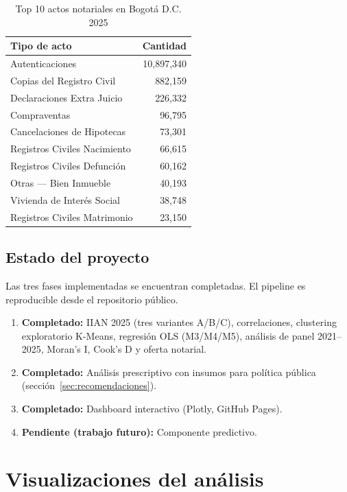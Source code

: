 \documentclass{article}
\begin{document}
\begin{table}[H]
\centering
\begin{tabular}{lr}
\toprule
\textbf{Tipo de acto} & \textbf{Cantidad} \\
\midrule
Autenticaciones              & 10,897,340 \\
Copias del Registro Civil    &    882,159 \\
Declaraciones Extra Juicio   &    226,332 \\
Compraventas                 &     96,795 \\
Cancelaciones de Hipotecas   &     73,301 \\
Registros Civiles Nacimiento &     66,615 \\
Registros Civiles Defunción  &     60,162 \\
Otras --- Bien Inmueble      &     40,193 \\
Vivienda de Interés Social   &     38,748 \\
Registros Civiles Matrimonio &     23,150 \\
\bottomrule
\end{tabular}
\caption{Top 10 actos notariales en Bogotá D.C. 2025}
\end{table}

\subsection{Estado del proyecto}

Las tres fases implementadas se encuentran completadas. El pipeline
es reproducible desde el repositorio público.

\begin{enumerate}
    \item \textbf{Completado:} IIAN 2025 (tres variantes A/B/C),
    correlaciones, clustering exploratorio K-Means, regresión OLS
    (M3/M4/M5), análisis de panel 2021--2025, Moran's I, Cook's D
    y oferta notarial.
    \item \textbf{Completado:} Análisis prescriptivo con insumos para
    política pública (sección~\ref{sec:recomendaciones}).
    \item \textbf{Completado:} Dashboard interactivo (Plotly,
    GitHub Pages).
    \item \textbf{Pendiente (trabajo futuro):} Componente predictivo.
\end{enumerate}

\newpage
\section{Visualizaciones del análisis}
\end{document}
